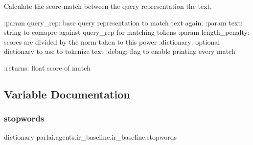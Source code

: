 \begin{DoxyVerb}Calculate the score match between the query representation the text.

:param query_rep: base query representation to match text again.
:param text: string to comapre against query_rep for matching tokens
:param length_penalty: scores are divided by the norm taken to this power
:dictionary: optional dictionary to use to tokenize text
:debug: flag to enable printing every match

:returns: float score of match
\end{DoxyVerb}
 

\subsection{Variable Documentation}
\mbox{\label{namespaceparlai_1_1agents_1_1ir__baseline_1_1ir__baseline_ad39f034177c71e873eeedb1cc2d24e52}} 
\subsubsection{\texorpdfstring{stopwords}{stopwords}}
{\footnotesize\ttfamily dictionary parlai.\+agents.\+ir\+\_\+baseline.\+ir\+\_\+baseline.\+stopwords}

